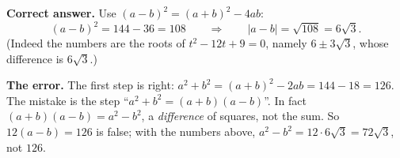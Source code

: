 \textbf{Correct answer.} Use $(a-b)^2=(a+b)^2-4ab$:
\[
(a-b)^2=144-36=108\qquad\Longrightarrow\qquad|a-b|=\sqrt{108}=\boxed{6\sqrt3}.
\]
(Indeed the numbers are the roots of $t^2-12t+9=0$, namely $6\pm3\sqrt3$, whose difference is $6\sqrt3$.)

\textbf{The error.} The first step is right: $a^2+b^2=(a+b)^2-2ab=144-18=126$. The mistake is the step ``$a^2+b^2=(a+b)(a-b)$''. In fact $(a+b)(a-b)=a^2-b^2$, a \emph{difference} of squares, not the sum. So $12(a-b)=126$ is false; with the numbers above, $a^2-b^2=12\cdot6\sqrt3=72\sqrt3$, not $126$.
